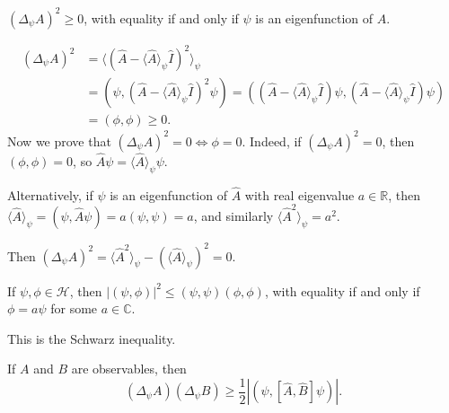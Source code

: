 \documentclass[12pt]{article}
\begin{document}
\begin{lemma}
	$(\Delta_{\psi} A)^2 \geq 0$, with equality if and only if $\psi$ is an eigenfunction of $A$.
\end{lemma}

\begin{proofbox}
	\begin{align*}
		(\Delta_{\psi}A)^2 &= \langle (\hat A - \langle \hat A \rangle_{\psi} \hat I)^2 \rangle_{\psi} \\
				   &= (\psi, (\hat A - \langle \hat A \rangle_{\psi} \hat I)^2 \psi) = ((\hat A - \langle \hat A \rangle_{\psi} \hat I)\psi, (\hat A - \langle \hat A \rangle_{\psi} \hat I)\psi) \\
				   &= (\phi, \phi) \geq 0.
	\end{align*}
	Now we prove that $(\Delta_{\psi}A)^2 = 0 \iff \phi = 0$. Indeed, if $(\Delta_{\psi}A)^2 = 0$, then $(\phi, \phi) = 0$, so $\hat A \psi = \langle \hat A \rangle_{\psi} \psi$.

		Alternatively, if $\psi$ is an eigenfunction of $\hat A$ with real eigenvalue $a \in \mathbb{R}$, then $\langle \hat A \rangle_{\psi} = (\psi, \hat A \psi) = a (\psi, \psi) = a$, and similarly $\langle \hat A^2 \rangle_{\psi} = a^2$.

		Then $(\Delta_{\psi}A)^2 = \langle \hat A^2 \rangle_{\psi} - (\langle \hat A \rangle_{\psi})^2 = 0$.
\end{proofbox}

\begin{lemma}
	If $\psi, \phi \in \mathcal{H}$, then $|(\psi, \phi)|^2 \leq (\psi, \psi)(\phi, \phi)$, with equality if and only if $\phi = a \psi$ for some $a \in \mathbb{C}$.
\end{lemma}

This is the Schwarz inequality.

\begin{theorem}
	If $A$ and $B$ are observables, then
	\[
		(\Delta_{\psi}A)(\Delta_{\psi}B) \geq \frac{1}{2} |(\psi, [\hat A, \hat B]\psi)|
	.\]
\end{theorem}
\end{document}
